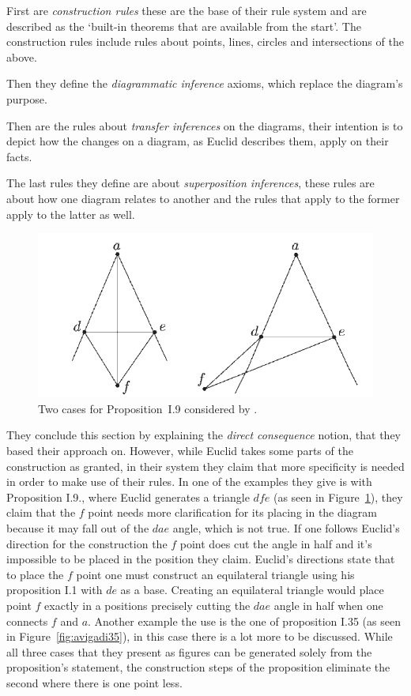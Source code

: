 \documentclass[]{interact}
\theoremstyle{plain}
\theoremstyle{definition}
\theoremstyle{remark}
\newcommand{\term}[1]{\emph{#1\/}}
\newcommand{\quotes}[1]{`#1'}
\begin{document}
First are \term{construction rules} these are the base of their rule
system and are described as the
\quotes{built-in theorems that are available from the start}.
The construction rules include rules about points, lines, circles and
intersections of the above.

Then they define the \term{diagrammatic inference} axioms, which
replace the diagram's purpose.

Then are the rules about \term{transfer inferences} on the diagrams,
their intention is to depict how the changes on a diagram, as Euclid
describes them, apply on their facts.

The last rules they define are about \term{superposition inferences},
these rules are about how one diagram relates to another and the rules
that apply to the former apply to the latter as well.


\begin{figure}[t]
  \centering
  \includegraphics[scale=0.5]{avigad-fig8-I9}
  \caption[Avigad et al Approach I.9]{Two cases for Proposition~I.9
    considered by \citet{avigad-etal:2009}.}
  \label{fig:avigadi9}
\end{figure}


They conclude this section by explaining the \term{direct consequence}
notion, that they based their approach on. However, while Euclid takes
some parts of the construction as granted, in their system they claim
that more specificity is needed in order to make use of their rules.
In one of the examples they give is with Proposition I.9., where
Euclid generates a triangle $dfe$ (as seen in
Figure~\ref{fig:avigadi9}), they claim that the $f$ point needs more
clarification for its placing in the diagram because it may fall out
of the $dae$ angle, which is not true. If one follows Euclid's
direction for the construction the $f$ point does cut the angle in
half and it's impossible to be placed in the position they claim.
Euclid's directions state that to place the $f$ point one must
construct an equilateral triangle using his proposition I.1 with $de$
as a base. Creating an equilateral triangle would place point $f$
exactly in a positions precisely cutting the $dae$ angle in half when
one connects $f$ and $a$. Another example the use is the one of
proposition I.35 (as seen in Figure~\ref{fig:avigadi35}), in this case
there is a lot more to be discussed. While all three cases that they
present as figures can be generated solely from the proposition's
statement, the construction steps of the proposition eliminate the
second where there is one point less.
\end{document}

